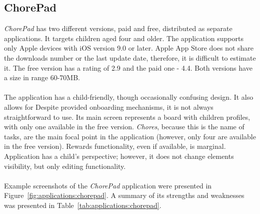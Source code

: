 \subsection{ChorePad}\label{subsec:market:solutions:chorepad}
\textit{ChorePad} \cite{ChorePadLite,ChorePadChores} has two different versions, paid and free, distributed as separate applications. It targets children aged four and older. The application supports only Apple devices with iOS version 9.0 or later. Apple App Store does not share the downloads number or the last update date, therefore, it is difficult to estimate it. The free version has a rating of 2.9 and the paid one - 4.4. Both versions have a size in range 60-70MB.
\\\\
The application has a child-friendly, though occasionally confusing design. It also allows for Despite provided onboarding mechanisms, it is not always straightforward to use. Its main screen represents a board with children profiles, with only one available in the free version. \textit{Chores}, because this is the name of tasks, are the main focal point in the application (however, only four are available in the free version). Rewards functionality, even if available, is marginal. Application has a child's perspective; however, it does not change elements visibility, but only editing functionality.
\\\\
Example screenshots of the \textit{ChorePad} application were presented in Figure~\ref{fig:applications:chorepad}. A summary of its strengths and weaknesses was presented in Table~\ref{tab:applications:chorepad}.
\\




